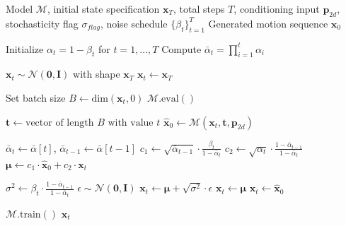 \begin{algorithm}
\caption{Reverse Denoising Sampling}
\label{alg:reverse_denoising}
\begin{algorithmic}[1]
\Require Model $\mathcal{M}$, initial state specification $\mathbf{x}_T$, total steps $T$, conditioning input $\mathbf{p}_{2d}$, stochasticity flag $\sigma_{flag}$, noise schedule $\{\beta_t\}_{t=1}^T$
\Ensure Generated motion sequence $\mathbf{x}_0$

\State Initialize $\alpha_t = 1 - \beta_t$ for $t = 1,\dots,T$
\State Compute $\bar{\alpha}_t = \prod_{i=1}^{t} \alpha_i$ 

    \State $\mathbf{x}_t \sim \mathcal{N}(\mathbf{0}, \mathbf{I})$ with shape $\mathbf{x}_T$
\Else
    \State $\mathbf{x}_t \leftarrow \mathbf{x}_T$ 
\EndIf

\State Set batch size $B \leftarrow \text{dim}(\mathbf{x}_t, 0)$
\State $\mathcal{M}.\text{eval}()$ 

    \State $\mathbf{t} \leftarrow \text{vector of length } B \text{ with value } t$ 
    \State $\hat{\mathbf{x}}_0 \leftarrow \mathcal{M}(\mathbf{x}_t, \mathbf{t}, \mathbf{p}_{2d})$ 
    
        \State $\bar{\alpha}_t \leftarrow \bar{\alpha}[t]$, $\bar{\alpha}_{t-1} \leftarrow \bar{\alpha}[t-1]$
        \State $c_1 \leftarrow \sqrt{\bar{\alpha}_{t-1}} \cdot \frac{\beta_t}{1 - \bar{\alpha}_t}$
        \State $c_2 \leftarrow \sqrt{\alpha_t} \cdot \frac{1 - \bar{\alpha}_{t-1}}{1 - \bar{\alpha}_t}$
        \State $\boldsymbol{\mu} \leftarrow c_1 \cdot \hat{\mathbf{x}}_0 + c_2 \cdot \mathbf{x}_t$ 
        
            \State $\sigma^2 \leftarrow \beta_t \cdot \frac{1 - \bar{\alpha}_{t-1}}{1 - \bar{\alpha}_t}$ 
            \State $\epsilon \sim \mathcal{N}(\mathbf{0}, \mathbf{I})$
            \State $\mathbf{x}_t \leftarrow \boldsymbol{\mu} + \sqrt{\sigma^2} \cdot \epsilon$ 
        \Else
            \State $\mathbf{x}_t \leftarrow \boldsymbol{\mu}$ 
        \EndIf
    \Else
        \State $\mathbf{x}_t \leftarrow \hat{\mathbf{x}}_0$ 
    \EndIf
\EndFor

\State $\mathcal{M}.\text{train}()$ 
\State \Return $\mathbf{x}_t$
\end{algorithmic}
\end{algorithm}


